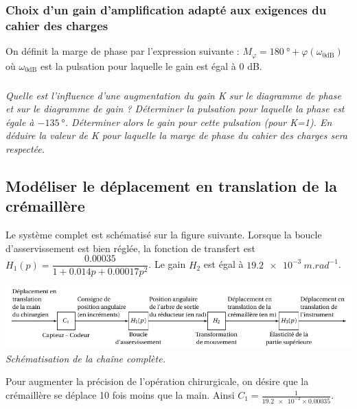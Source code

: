 \documentclass[10pt,fleqn]{article} %
\begin{document}
\subsubsection*{Choix d'un gain d'amplification adapté aux exigences du cahier des charges\\}

On définit la marge de phase par l'expression suivante : $M_{\varphi}=\SI{180}{\degree}+\varphi(\omega_{0\text{dB}})$ où $\omega_{0\text{dB}}$ est la pulsation pour laquelle le gain est égal à 0 dB.

\subparagraph{}\textit{Quelle est l'influence d'une augmentation du gain K sur le diagramme de phase et sur le diagramme de gain ? Déterminer la pulsation pour laquelle la phase est égale à $\SI{-135}{\degree}$. Déterminer alors le gain pour cette pulsation (pour K=1). En déduire la valeur de K pour laquelle la marge de phase du cahier des charges sera respectée.}



\subsection{Modéliser le déplacement en translation de la crémaillère\\}

Le système complet est schématisé sur la figure suivante. 
Lorsque la boucle d'asservissement est bien réglée, la fonction de transfert est $H_1(p)=\dfrac{\num{0,00035}}{1+\num{0,014} p + \num{0,00017} p^2}$.
Le gain $H_2$ est égal à $\SI{19,2e-3}{m.rad^{-1}}$. 

\begin{center}%
	\includegraphics{images2/chaine_entiere}
	\textit{Schématisation de la chaîne complète.}
\end{center}

Pour augmenter la précision de l'opération chirurgicale, on désire que la crémaillère se déplace 10 fois moins que la main. Ainsi $C_1=\frac{1}{\num{19,2e-2}\times\num{0,00035}}$.
\end{document}
